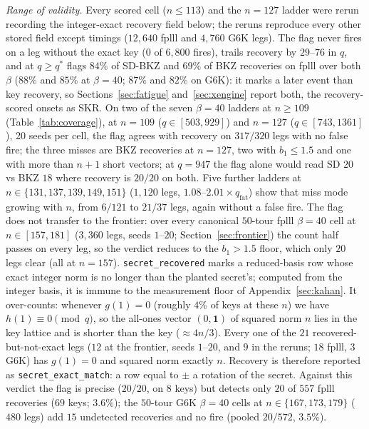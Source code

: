 \documentclass[journal=cic,version=preprint]{iacrj}
\begin{document}
\emph{Range of validity.} Every scored cell ($n\le113$) and the $n=127$
ladder were rerun recording the integer-exact recovery field below; the
reruns reproduce every other stored field except timings ($12{,}640$ fplll and $4{,}760$ G6K
legs). The flag never fires on a leg without the exact key ($0$ of $6{,}800$
fires), trails recovery by $29$--$76$ in $q$, and at $q\ge q^\ast$ flags
$84\%$ of SD-BKZ and $69\%$ of BKZ recoveries on fplll over both $\beta$
($88\%$ and $85\%$ at $\beta=40$; $87\%$ and $82\%$ on G6K): it marks a later event than key recovery, so
Sections~\ref{sec:fatigue} and~\ref{sec:xengine} report both, the
recovery-scored onsets as SKR. On two of the seven $\beta=40$ ladders at
$n\ge109$ (Table~\ref{tab:coverage}), at
$n=109$ ($q\in[503,929]$) and $n=127$ ($q\in[743,1361]$), 20 seeds per
cell, the flag agrees with recovery on $317/320$
legs with no false fire; the three misses are BKZ recoveries at $n=127$, two
with $b_1\le1.5$ and one with more than $n{+}1$ short vectors; at $q=947$ the
flag alone would read SD $20$ vs BKZ $18$ where recovery is $20/20$ on both.
Five further ladders at $n\in\{131,137,139,149,151\}$
($1{,}120$ legs, $1.08$--$2.01\times q_\mathrm{fat}$) show that miss mode
growing with $n$, from $6/121$ to $21/37$ legs, again without a false fire.
The flag does not transfer to the frontier: over every canonical $50$-tour fplll
$\beta=40$ cell at $n\in[157,181]$ ($3{,}360$ legs, seeds $1$--$20$; Section~\ref{sec:frontier})
the count half passes on every leg, so the verdict reduces to the $b_1>1.5$
floor, which only $20$ legs clear (all at $n=157$).
\texttt{secret\_recovered} marks a reduced-basis row whose exact integer norm
is no longer than the planted secret's; computed from the integer basis, it is
immune to the measurement floor of Appendix~\ref{sec:kahan}. It over-counts:
whenever $g(1)=0$ (roughly $4\%$ of keys at these $n$) we have $h(1)\equiv0
\pmod q$, so the all-ones vector $(0,\mathbf 1)$ of squared norm $n$ lies in
the key lattice and is shorter than the key ($\approx4n/3$). Every one of the
$21$ recovered-but-not-exact legs ($12$ at the frontier, seeds $1$--$20$,
and $9$ in the reruns; $18$ fplll, $3$ G6K) has
$g(1)=0$ and squared norm exactly $n$. Recovery is therefore reported as
\texttt{secret\_exact\_match}: a row equal to $\pm$ a rotation of the secret.
Against this verdict the flag is precise ($20/20$, on $8$ keys) but detects
only $20$ of $557$ fplll recoveries ($69$ keys; $3.6\%$); the $50$-tour G6K $\beta=40$ cells at
$n\in\{167,173,179\}$ ($480$ legs) add $15$ undetected recoveries and no fire
(pooled $20/572$, $3.5\%$).
\end{document}
